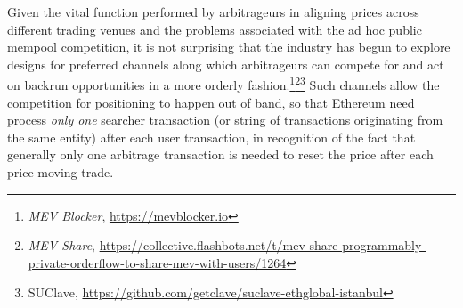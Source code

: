Given the vital function performed by arbitrageurs in aligning prices across different trading venues and the problems associated with the ad hoc public mempool competition, it is not surprising that the industry has begun to explore designs for preferred channels along which arbitrageurs can compete for and act on backrun opportunities in a more orderly fashion.\footnote{\emph{MEV Blocker}, \url{https://mevblocker.io}}\footnote{\emph{MEV-Share}, \url{https://collective.flashbots.net/t/mev-share-programmably-private-orderflow-to-share-mev-with-users/1264}}\footnote{SUClave, \url{https://github.com/getclave/suclave-ethglobal-istanbul}}
%
Such channels allow the competition for positioning to happen out of band, so that Ethereum need process \emph{only one} searcher transaction (or string of transactions originating from the same entity) after each user transaction, in recognition of the fact that generally only one arbitrage transaction is needed to reset the price after each price-moving trade.



